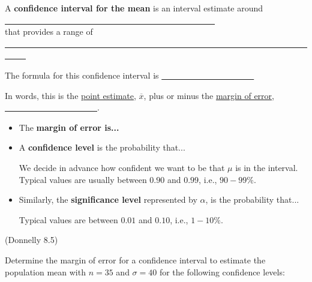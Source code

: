 \documentclass[12pt, letterpaper]{article}
\newcounter{exercise}
\theoremstyle{definition}
\begin{document}
\begin{defn}
A \textbf{confidence interval for the mean} is an interval estimate around\\


\underline{~~~~~~~~~~~~~~~~~~~~~~~~~~~~~~~~~~~~~~~~~~~~~~~~~~}\\

 that provides a range of \underline{~~~~~~~~~~~~~~~~~~~~~~~~~~~~~~~~~~~~~~~~~~~~~~~~~~~~~~~~~~~~~~~~~~~~~~~~~~~~~}

\vspace*{.2in}

The formula for this confidence interval is \underline{~~~~~~~~~~~~~~~~~~~~~~}

\vspace*{.2in}

In words, this is the \underline{point estimate}, $\overline{x}$, plus or minus the \underline{margin of error}, \underline{~~~~~~~~~~~~~~~~~~~~~~}.  

\vspace*{.2in}



\begin{itemize}

\item The \textbf{margin of error is...}
\vspace*{.5in}


\item A \textbf{confidence level} is the probability that...
\vspace*{.5in}

We decide in advance how confident we want to be that $\mu$ is in the interval.  Typical values are usually between $0.90$ and $0.99$, i.e., $90-99\%$.

\item Similarly, the \textbf{significance level} represented by $\alpha$, is the probability that...
\vspace*{.5in}

Typical values are between $0.01$ and $0.10$, i.e., $1-10\%$.


\end{itemize}

\end{defn}


\begin{exercise}  (Donnelly 8.5)

Determine the margin of error for a confidence interval to estimate the population mean with $n=35$ and $\sigma=40$ for the following confidence levels:

\end{exercise}
\end{document}
